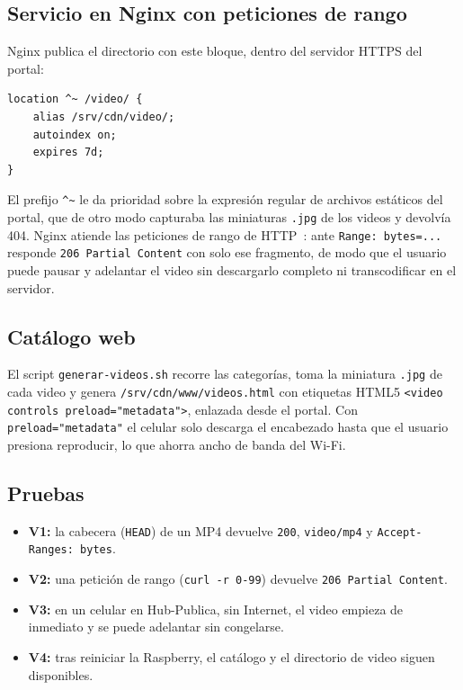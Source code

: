 \documentclass[conference]{IEEEtran}
\begin{document}
\subsection{Servicio en Nginx con peticiones de rango}
Nginx publica el directorio con este bloque, dentro del servidor HTTPS del portal:
\begin{lstlisting}
location ^~ /video/ {
    alias /srv/cdn/video/;
    autoindex on;
    expires 7d;
}
\end{lstlisting}
El prefijo \texttt{\textasciicircum\textasciitilde} le da prioridad sobre la expresión regular de archivos estáticos del portal, que de otro modo capturaba las miniaturas \texttt{.jpg} de los videos y devolvía 404. Nginx atiende las peticiones de rango de HTTP~\cite{rfc9110}: ante \texttt{Range: bytes=...} responde \texttt{206 Partial Content} con solo ese fragmento, de modo que el usuario puede pausar y adelantar el video sin descargarlo completo ni transcodificar en el servidor.

\subsection{Catálogo web}
El script \texttt{generar-videos.sh} recorre las categorías, toma la miniatura \texttt{.jpg} de cada video y genera \texttt{/srv/cdn/www/videos.html} con etiquetas HTML5 \texttt{<video controls preload="metadata">}, enlazada desde el portal. Con \texttt{preload="metadata"} el celular solo descarga el encabezado hasta que el usuario presiona reproducir, lo que ahorra ancho de banda del Wi-Fi.

\subsection{Pruebas}
\begin{itemize}
\item \textbf{V1:} la cabecera (\texttt{HEAD}) de un MP4 devuelve \texttt{200}, \texttt{video/mp4} y \texttt{Accept-Ranges: bytes}.
\item \textbf{V2:} una petición de rango (\texttt{curl -r 0-99}) devuelve \texttt{206 Partial Content}.
\item \textbf{V3:} en un celular en Hub-Publica, sin Internet, el video empieza de inmediato y se puede adelantar sin congelarse.
\item \textbf{V4:} tras reiniciar la Raspberry, el catálogo y el directorio de video siguen disponibles.
\end{itemize}
\end{document}
